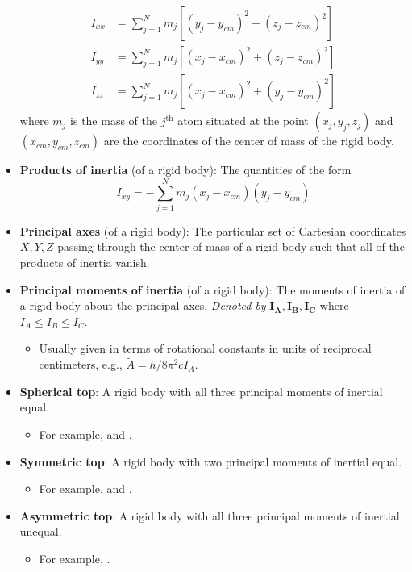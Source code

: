 \documentclass[../notes.tex]{subfiles}
\begin{document}
\begin{itemize}
\begin{align*}
        I_{xx} &= \sum_{j=1}^Nm_j[(y_j-y_{cm})^2+(z_j-z_{cm})^2]\\
        I_{yy} &= \sum_{j=1}^Nm_j[(x_j-x_{cm})^2+(z_j-z_{cm})^2]\\
        I_{zz} &= \sum_{j=1}^Nm_j[(x_j-x_{cm})^2+(y_j-y_{cm})^2]
    \end{align*}
    \endgroup
    where $m_j$ is the mass of the $j^\text{th}$ atom situated at the point $(x_j,y_j,z_j)$ and $(x_{cm},y_{cm},z_{cm})$ are the coordinates of the center of mass of the rigid body.
    \item \textbf{Products of inertia} (of a rigid body): The quantities of the form
    \begin{equation*}
        I_{xy} = -\sum_{j=1}^Nm_j(x_j-x_{cm})(y_j-y_{cm})
    \end{equation*}
    \item \textbf{Principal axes} (of a rigid body): The particular set of Cartesian coordinates $X,Y,Z$ passing through the center of mass of a rigid body such that all of the products of inertia vanish.
    \item \textbf{Principal moments of inertia} (of a rigid body): The moments of inertia of a rigid body about the principal axes. \emph{Denoted by} $\bm{I_A},\bm{I_B},\bm{I_C}$ where $I_A\leq I_B\leq I_C$.
    \begin{itemize}
        \item Usually given in terms of rotational constants in units of reciprocal centimeters, e.g., $\tilde{A}=h/8\pi^2cI_A$.
    \end{itemize}
    \item \textbf{Spherical top}: A rigid body with all three principal moments of inertial equal.
    \begin{itemize}
        \item For example,  and .
    \end{itemize}
    \item \textbf{Symmetric top}: A rigid body with two principal moments of inertial equal.
    \begin{itemize}
        \item For example,  and .
    \end{itemize}
    \item \textbf{Asymmetric top}: A rigid body with all three principal moments of inertial unequal.
    \begin{itemize}
        \item For example, .
    \end{itemize}

\end{itemize}
\end{document}
